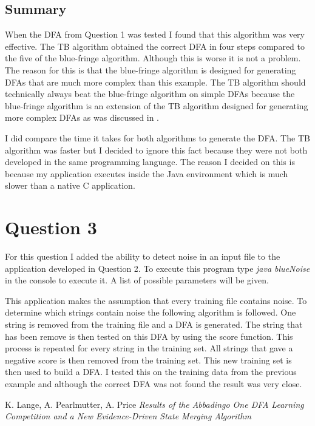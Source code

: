 \documentclass[a4paper,11pt,titlepage]{article}
\begin{document}
\subsection{Summary}
When the DFA from Question 1 was tested I found that this algorithm was very effective. The TB algorithm obtained the correct DFA in four steps compared to the five of the blue-fringe algorithm. Although this is worse it is not a problem. The reason for this is that the blue-fringe algorithm is designed for generating DFAs that are much more complex than this example. The TB algorithm should technically always beat the blue-fringe algorithm on simple DFAs because the blue-fringe algorithm is an extension of the TB algorithm designed for generating more complex DFAs as was discussed in \cite{lang}.

I did compare the time it takes for both algorithms to generate the DFA. The TB algorithm was faster but I decided to ignore this fact because they were not both developed in the same programming language. The reason I decided on this is because my application executes inside the Java environment which is much slower than a native C application.
\section{Question 3}
For this question I added the ability to detect noise in an input file to the application developed in Question 2. To execute this program type \emph{java blueNoise} in the console to execute it. A list of possible parameters will be given.

This application makes the assumption that every training file contains noise. To determine which strings contain noise the following algorithm is followed. One string is removed from the training file and a DFA is generated. The string that has been remove is then tested on this DFA by using the score function. This process is repeated for every string in the training set. All strings that gave a negative score is then removed from the training set. This new training set is then used to build a DFA. I tested this on the training data from the previous example and although the correct DFA was not found the result was very close.

\begin{thebibliography}{9}
 K. Lange, A. Pearlmutter, A. Price
\emph{Results of the Abbadingo One DFA Learning
Competition and a New Evidence-Driven
State Merging Algorithm}


\end{thebibliography}
\end{document}
